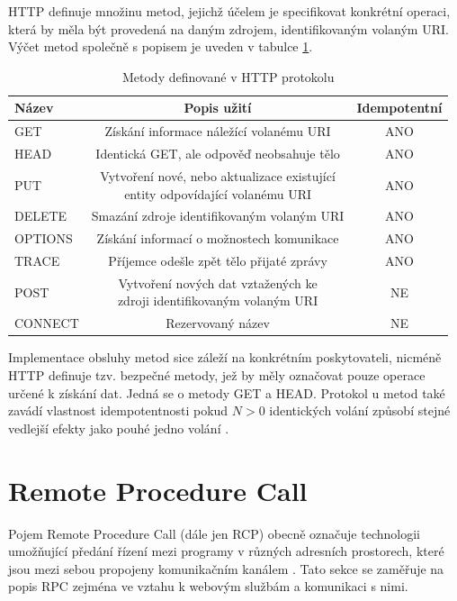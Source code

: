\documentclass[czech,DP]{thesiskiv}
\begin{document}
HTTP definuje množinu metod, jejichž účelem je specifikovat konkrétní operaci, která by měla být provedená na daným zdrojem, identifikovaným volaným URI. Výčet metod společně s popisem je uveden v tabulce \ref{tab:http-methods}.

\begin{table}[h]
	\centering
	\begin{tabular}{|l|c|c|}
		\hline
		Název & Popis užití & Idempotentní \\
		\hline
		\hline
		GET & Získání informace náležící volanému URI & ANO \\
		\hline
		HEAD & Identická GET, ale odpověď neobsahuje tělo & ANO \\
		\hline
		PUT & \makecell{Vytvoření nové, nebo aktualizace existující \\ entity odpovídající volanému URI }  & ANO \\
		\hline
		DELETE & Smazání zdroje identifikovaným volaným URI & ANO \\
		\hline
		OPTIONS & Získání informací o možnostech komunikace  & ANO \\
		\hline
		TRACE & Příjemce odešle zpět tělo přijaté zprávy & ANO \\
		\hline
		POST & \makecell{Vytvoření nových dat vztažených ke \\ zdroji identifikovaným volaným URI} & NE \\
		\hline
		CONNECT & Rezervovaný název & NE \\
		\hline		
	\end{tabular}
	\caption{Metody definované v HTTP protokolu}
	\label{tab:http-methods}
\end{table}

Implementace obsluhy metod sice záleží na konkrétním poskytovateli, nicméně HTTP definuje tzv. bezpečné metody, jež by měly označovat pouze operace určené k získání dat. Jedná se o metody GET a HEAD. Protokol u metod také zavádí vlastnost idempotentnosti pokud $N>0$ identických volání způsobí stejné vedlejší efekty jako pouhé jedno volání \cite{httpRfc}.


\section{Remote Procedure Call}
\label{sec:rpc-ws}

Pojem Remote Procedure Call (dále jen RCP) obecně označuje technologii umožňující předání řízení mezi programy v různých adresních prostorech, které jsou mezi sebou propojeny komunikačním kanálem \cite{rpcThesis}. Tato sekce se zaměřuje na popis RPC zejména ve vztahu k webovým službám a komunikaci s nimi.
\end{document}

